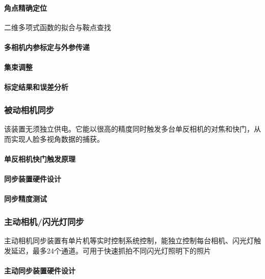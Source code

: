 \documentclass{ctexart}
\begin{document}
\paragraph{角点精确定位}二维多项式函数的拟合与鞍点查找

\paragraph{多相机内参标定与外参传递}

\paragraph{集束调整}

\paragraph{标定结果和误差分析}

\subsubsection{被动相机同步}

该装置无须独立供电。它能以很高的精度同时触发多台单反相机的对焦和快门，从而实现人脸多视角数据的捕获。

\paragraph{单反相机快门触发原理}

\paragraph{同步装置硬件设计}

\paragraph{同步精度测试}

\subsubsection{主动相机/闪光灯同步}

主动相机同步装置有单片机等实时控制系统控制，能独立控制每台相机、闪光灯触发延迟，最多24个通道。可用于快速抓拍不同闪光灯照明下的照片

\paragraph{主动同步装置硬件设计}
\end{document}
